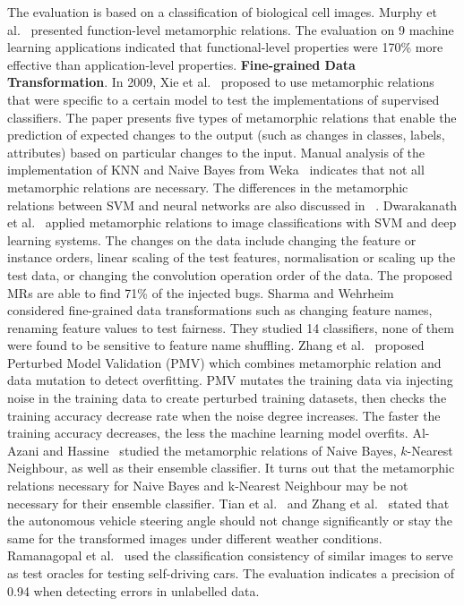 The evaluation is based on a classification of biological cell images.
Murphy et al.~ presented function-level metamorphic relations. The evaluation on 9 machine learning applications indicated that functional-level properties were 170\% more effective than application-level properties.
\noindent \textbf{Fine-grained Data Transformation}.
In 2009, Xie et al.~ proposed to use metamorphic relations that were specific to a certain model to test the implementations of supervised classifiers.
The paper presents five types of metamorphic relations that enable the prediction of expected changes to the output (such as changes in classes, labels, attributes) based on particular changes to the input.
Manual analysis of the implementation of KNN and Naive Bayes from Weka~ indicates that not all metamorphic relations are necessary.
The differences in the metamorphic relations between SVM and neural networks are also discussed in ~.
Dwarakanath et al.~ applied metamorphic relations to image classifications with SVM and deep learning systems.
The changes on the data include changing the feature or instance orders, linear scaling of the test features, normalisation or scaling up the test data, or changing the convolution operation order of the data. 
The proposed MRs are able to find 71\% of the injected bugs.
Sharma and Wehrheim~ considered fine-grained data transformations such as changing feature names, renaming feature values to test fairness. They studied 14 classifiers, none of them were found to be sensitive to feature name shuffling.
Zhang et al.~ proposed Perturbed Model Validation (PMV) which combines metamorphic relation and data mutation to detect overfitting.
PMV mutates the training data via injecting noise in the training data to create perturbed training datasets, then checks the training accuracy decrease rate when the noise degree increases.
The faster the training accuracy decreases, the less the machine learning model overfits. 
Al-Azani and Hassine~ studied the metamorphic relations of Naive Bayes, $k$-Nearest Neighbour, as well as their ensemble classifier.
It turns out that the metamorphic relations necessary for Naive Bayes and k-Nearest Neighbour may be not necessary for their ensemble classifier.
Tian et al.~ and Zhang et al.~ stated that the autonomous vehicle steering angle should not change significantly or stay the same for the transformed images under different weather conditions. 
Ramanagopal et al.~ used the classification consistency of similar images to serve as test oracles for testing self-driving cars. 
The evaluation indicates a precision of 0.94 when detecting errors in unlabelled data. 

